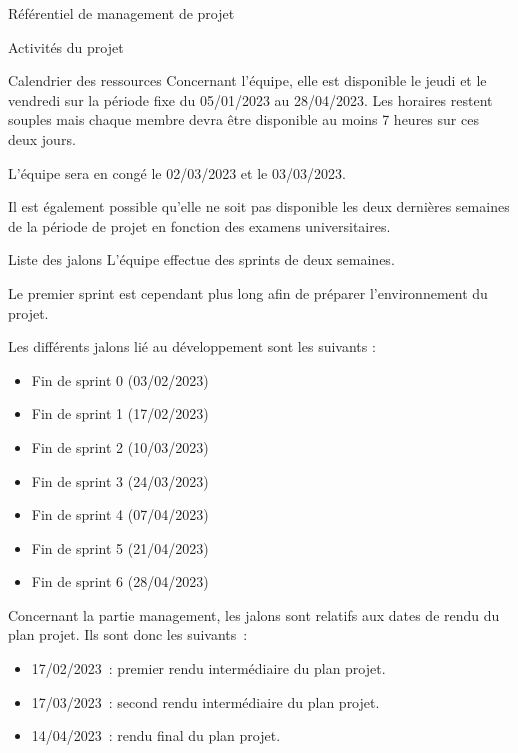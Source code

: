 \documentclass[]{article}
\begin{document}
{\begin{section}{\label{sec:Référentiel de management de projet}Référentiel de management de projet}
\begin{subsection}{\label{sec:Activités du projet}Activités du projet}
\begin{subsubsection}{\label{sec:Calendrier des ressources}Calendrier des ressources}
             Concernant l’équipe, elle est disponible le jeudi et le vendredi sur la période fixe du 05/01/2023 au 28/04/2023. Les horaires restent souples mais chaque membre devra être disponible au moins 7 heures sur ces deux jours.

             L’équipe sera en congé le 02/03/2023 et le 03/03/2023.

             Il est également possible qu’elle ne soit pas disponible les deux dernières semaines de la période de projet en fonction des examens universitaires.
         \end{subsubsection}

         \begin{subsubsection}{\label{sec:Liste des jalons}Liste des jalons}
             L’équipe effectue des sprints de deux semaines.

             Le premier sprint est cependant plus long afin de préparer l’environnement du projet.

             Les différents jalons lié au développement sont les suivants :
             \begin{itemize}
                 \item Fin de sprint 0 (03/02/2023)
                 \item Fin de sprint 1 (17/02/2023)
                 \item Fin de sprint 2 (10/03/2023)
                 \item Fin de sprint 3 (24/03/2023)
                 \item Fin de sprint 4 (07/04/2023)
                 \item Fin de sprint 5 (21/04/2023)
                 \item Fin de sprint 6 (28/04/2023)
             \end{itemize}

             Concernant la partie management, les jalons sont relatifs aux dates de rendu du plan projet. Ils sont donc les suivants :
             \begin{itemize}
                 \item 17/02/2023 : premier rendu intermédiaire du plan projet.
                 \item 17/03/2023 : second rendu intermédiaire du plan projet.
                 \item 14/04/2023 : rendu final du plan projet.
             \end{itemize}
         \end{subsubsection}


\end{subsection}
\end{section}}
\end{document}
